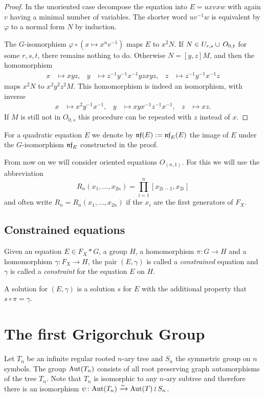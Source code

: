 \documentclass[a4paper,11pt]{amsart}
\begin{document}
\begin{proof}
  In the unoriented case decompose the equation into $E = uxvxw$ with
  again $v$ having a minimal number of variables.  The shorter word
  $uv^{-1}w$ is equivalent by $\varphi$ to a normal form $N$ by
  induction.
 
  The $G$-isomorphism $\varphi \circ (x\mapsto x^uv^{-1})$ maps $E$ to
  $x^2N$. If $N\in U_{r,s}\cup\thinspace O_{0,t}$ for some $r,s,t$,
  there remains nothing to do.  Otherwise $N=[y,z]M$, and then the
  homomorphism
  \begin{align*}
    x&\mapsto xyz, & y&\mapsto z^{-1}y^{-1}x^{-1}yzxyz, & z&\mapsto z^{-1}y^{-1}x^{-1}z
  \end{align*}
  maps $x^2N$ to $x^2y^2z^2M$. This homomorphism is indeed an
  isomorphism, with inverse
  \begin{align*}
    x&\mapsto x^2y^{-1}x^{-1}, & y&\mapsto xyx^{-1}z^{-1}x^{-1}, & z&\mapsto xz.
  \end{align*}
  If $M$ is still not in $O_{0,s}$ this procedure can be repeated with
  $z$ instead of $x$.
\end{proof}
For a quadratic equation $E$ we denote by $\mathfrak{nf}(E) := \mathfrak{nf}_E(E)$
the image of $E$ under the $G$-isomorphism $\mathfrak{nf}_E$ constructed in
the proof.

From now on we will consider oriented equations $O_{(n,1)}$. For this
we will use the abbreviation
\[R_n(x_1,\ldots,x_{2n})=\prod_{i=1}^n [x_{2i-1},x_{2i}]\]
and often write $R_n=R_n(x_1,\ldots,x_{2n})$ if the $x_i$ are the
first generators of $F_X$.

\subsection{Constrained equations}
\begin{defi}
  Given an equation $E \in F_X*G$, a group $H$, a homomorphism
  $\pi\colon G \to H$ and a homomorphism $\gamma\colon F_X \to H$, the
  pair $(E,\gamma)$ is called a \emph{constrained} equation and
  $\gamma$ is called a \emph{constraint} for the equation $E$ on $H$.
 
  A solution for $(E,\gamma)$ is a solution $s$ for $E$ with the
  additional property that $s\circ\pi=\gamma$.
\end{defi}

\section{The first Grigorchuk Group}\label{sec:GrigorchukGroup}
Let $T_n$ be an infinite regular rooted $n$-ary tree and $S_n$ the symmetric group on $n$ symbols.
The group $\textup{Aut}(T_n)$ consists of all root preserving graph automorphisms of the tree $T_n$. 
Note that $T_n$ is isomorphic to any $n$-ary subtree and therefore there is an isomorphism
$\psi\colon \textup{Aut}(T_n)\xrightarrow{\sim} \textup{Aut}(T)\wr S_n$. 
\end{document}
